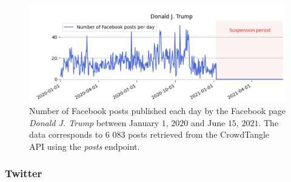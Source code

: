 \documentclass{article}
\begin{document}
\begin{figure}
	\centering
		\begin{multicols}{1}
			\includegraphics[scale=0.2]{./img/fb/fig1_fb.png}
		\end{multicols}
	\caption{Number of Facebook posts published each day by the Facebook page {\it Donald J. Trump} between January $1$, $2020$ and June $15$, $2021$. The data corresponds to $6$ $083$ posts retrieved from the CrowdTangle API using the {\it posts} endpoint.}
	\label{fig1_fb}
\end{figure}

\subsubsection{Twitter}
\end{document}
